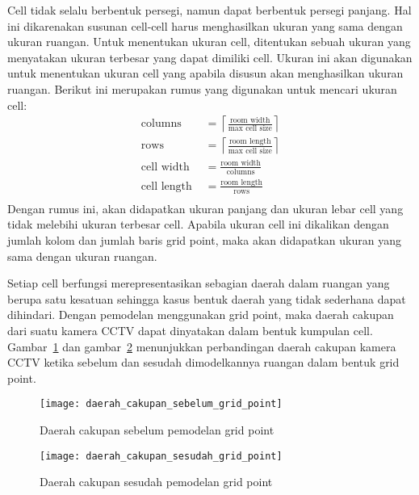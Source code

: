 Cell tidak selalu berbentuk persegi, namun dapat berbentuk persegi panjang. Hal ini dikarenakan susunan cell-cell harus menghasilkan ukuran yang sama dengan ukuran ruangan. Untuk menentukan ukuran cell, ditentukan sebuah ukuran yang menyatakan ukuran terbesar yang dapat dimiliki cell. Ukuran ini akan digunakan untuk menentukan ukuran cell yang apabila disusun akan menghasilkan ukuran ruangan. Berikut ini merupakan rumus yang digunakan untuk mencari ukuran cell:
\begin{equation*}
	\begin{split}
		\text{columns }&= \left\lceil\frac{\text{room width}}{\text{max cell size}}\right\rceil\\
		\text{rows }&= \left\lceil\frac{\text{room length}}{\text{max cell size}}\right\rceil\\
		\text{cell width }&= \frac{\text{room width}}{\text{columns}}\\
		\text{cell length }&= \frac{\text{room length}}{\text{rows}}\\
	\end{split}
\end{equation*}
Dengan rumus ini, akan didapatkan ukuran panjang dan ukuran lebar cell yang tidak melebihi ukuran terbesar cell. Apabila ukuran cell ini dikalikan dengan jumlah kolom dan jumlah baris grid point, maka akan didapatkan ukuran yang sama dengan ukuran ruangan.

Setiap cell berfungsi merepresentasikan sebagian daerah dalam ruangan yang berupa satu kesatuan sehingga kasus bentuk daerah yang tidak sederhana dapat dihindari. Dengan pemodelan menggunakan grid point, maka daerah cakupan dari suatu kamera CCTV dapat dinyatakan dalam bentuk kumpulan cell. Gambar~\ref{fig:daerah_cakupan_sebelum_grid_point} dan gambar~\ref{fig:daerah_cakupan_sesudah_grid_point} menunjukkan perbandingan daerah cakupan kamera CCTV ketika sebelum dan sesudah dimodelkannya ruangan dalam bentuk grid point.

\begin{figure}[h]
	\centering  
	\texttt{[image: daerah\_cakupan\_sebelum\_grid\_point]}
	\caption[Daerah cakupan sebelum pemodelan grid point]{Daerah cakupan sebelum pemodelan grid point}
	\label{fig:daerah_cakupan_sebelum_grid_point}
\end{figure}

\begin{figure}[h]
	\centering  
	\texttt{[image: daerah\_cakupan\_sesudah\_grid\_point]}
	\caption[Daerah cakupan sesudah pemodelan grid point]{Daerah cakupan sesudah pemodelan grid point}
	\label{fig:daerah_cakupan_sesudah_grid_point}
\end{figure}

